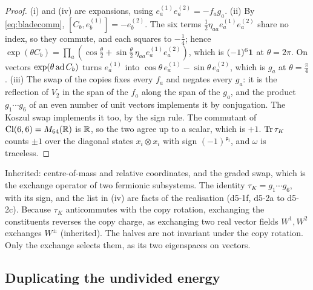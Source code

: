 \begin{proof}
(i) and (iv) are expansions, using $e^{(1)}_ae^{(2)}_a=-f_ag_a$. (ii) By \cref{eq:bladecomm}, $[C_b,e^{(1)}_b]=-e^{(2)}_b$. The six terms
$\tfrac12\eta_{aa}e^{(1)}_ae^{(2)}_a$ share no index, so they commute, and each squares to $-\tfrac14$; hence
$\exp(\theta C_b)=\prod_a(\cos\tfrac\theta2+\sin\tfrac\theta2\,\eta_{aa}e^{(1)}_ae^{(2)}_a)$, which is $(-1)^6\mathbf 1$ at $\theta=2\pi$. On vectors $\exp(\theta\operatorname{ad} C_b)$ turns
$e^{(1)}_a$ into $\cos\theta\,e^{(1)}_a-\sin\theta\,e^{(2)}_a$, which is $g_a$ at $\theta=\tfrac\pi4$. (iii) The swap of the copies fixes every $f_a$ and negates every $g_a$: it is the reflection of $V_2$
in the span of the $f_a$ along the span of the $g_a$, and the product $g_1\cdots g_6$ of an even number of unit vectors implements it by conjugation. The Koszul swap implements
it too, by the sign rule. The commutant of $\mathrm{Cl}(6,6)=M_{64}(\mathbb{R})$ is $\mathbb{R}$, so the two agree up to a scalar, which is $+1$. $\operatorname{Tr}\tau_K$ counts
$\pm1$ over the diagonal states $x_i\otimes x_i$ with sign $(-1)^{\mathsf p_i}$, and $\omega$ is traceless.
\end{proof}

Inherited: centre-of-mass and relative coordinates, and the graded swap, which is the exchange operator of two fermionic subsystems. The
identity $\tau_K=g_1\cdots g_6$, with its sign, and the list in (iv) are facts of the realisation (d5-1f, d5-2a to d5-2c). Because $\tau_K$
anticommutes with the copy rotation, exchanging the constituents reverses the copy charge, as exchanging two real vector fields $W^1,W^2$
exchanges $W^\pm$ (inherited). The halves are not invariant under the copy rotation. Only the exchange selects them, as its two eigenspaces
on vectors.

\subsection{Duplicating the undivided energy}
\label{d5:sec:energy}

